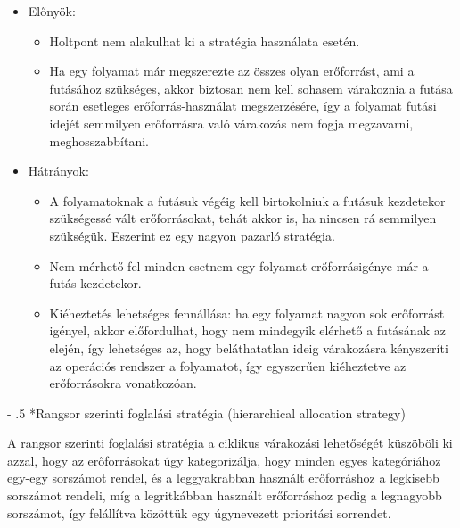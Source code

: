 \documentclass[tikz,12pt,margin=0px]{article}
\makeatletter
\renewcommand\paragraph{%
	\@startsection{paragraph}{4}{0mm}%
	{-\baselineskip}%
	{.5\baselineskip}%
	{\normalfont\normalsize\bfseries}}
\makeatother
\begin{document}
    \begin{itemize}[topsep=8pt,itemsep=4pt,partopsep=4pt, parsep=4pt]
        \item Előnyök:
        \begin{itemize}
            \item Holtpont nem alakulhat ki a stratégia használata esetén.
            \item Ha egy folyamat már megszerezte az összes olyan erőforrást, ami a futásához szükséges, akkor biztosan nem kell sohasem várakoznia a futása során esetleges erőforrás-használat megszerzésére, így a folyamat futási idejét semmilyen erőforrásra való várakozás nem fogja megzavarni, meghosszabbítani.
        \end{itemize}
        \item Hátrányok:
        \begin{itemize}
            \item A folyamatoknak a futásuk végéig kell birtokolniuk a futásuk kezdetekor szükségessé vált erőforrásokat, tehát akkor is, ha nincsen rá semmilyen szükségük. Eszerint ez egy nagyon pazarló stratégia.
            \item Nem mérhető fel minden esetnem egy folyamat erőforrásigénye már a futás kezdetekor.
            \item Kiéheztetés lehetséges fennállása: ha egy folyamat nagyon sok erőforrást igényel, akkor előfordulhat, hogy nem mindegyik elérhető a futásának az elején, így lehetséges az, hogy beláthatatlan ideig várakozásra kényszeríti az operációs rendszer a folyamatot, így egyszerűen kiéheztetve az erőforrásokra vonatkozóan.
        \end{itemize}
    \end{itemize}

    \paragraph*{Rangsor szerinti foglalási stratégia (hierarchical allocation strategy)}

    \noindent A rangsor szerinti foglalási stratégia a ciklikus várakozási lehetőségét küszöböli ki azzal, hogy az erőforrásokat úgy kategorizálja, hogy minden egyes kategóriához egy-egy sorszámot rendel, és a leggyakrabban használt erőforráshoz a legkisebb sorszámot rendeli, míg a legritkábban használt erőforráshoz pedig a legnagyobb sorszámot, így felállítva közöttük egy úgynevezett prioritási sorrendet.\\
\end{document}
